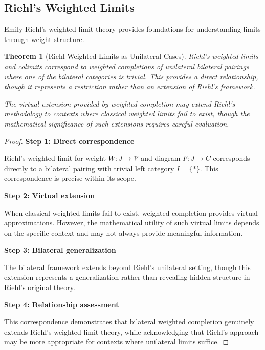 \documentclass[11pt]{article}
\theoremstyle{plain}
\newtheorem{theorem}{Theorem}[section]
\theoremstyle{definition}
\theoremstyle{remark}
\newcommand{\V}{\mathcal{V}}
\begin{document}
\subsection{Riehl's Weighted Limits}

Emily Riehl's weighted limit theory \cite{riehl2008weighted,riehl2014categorical} provides foundations for understanding limits through weight structure.

\begin{theorem}[Riehl Weighted Limits as Unilateral Cases]\label{thm:riehl-correspondence}
Riehl's weighted limits and colimits correspond to weighted completions of unilateral bilateral pairings where one of the bilateral categories is trivial. This provides a direct relationship, though it represents a restriction rather than an extension of Riehl's framework.

The virtual extension provided by weighted completion may extend Riehl's methodology to contexts where classical weighted limits fail to exist, though the mathematical significance of such extensions requires careful evaluation.
\end{theorem}

\begin{proof}
\textbf{Step 1: Direct correspondence}

Riehl's weighted limit for weight $W : J \to \V$ and diagram $F : J \to C$ corresponds directly to a bilateral pairing with trivial left category $I = \{*\}$. This correspondence is precise within its scope.

\textbf{Step 2: Virtual extension}

When classical weighted limits fail to exist, weighted completion provides virtual approximations. However, the mathematical utility of such virtual limits depends on the specific context and may not always provide meaningful information.

\textbf{Step 3: Bilateral generalization}

The bilateral framework extends beyond Riehl's unilateral setting, though this extension represents a generalization rather than revealing hidden structure in Riehl's original theory.

\textbf{Step 4: Relationship assessment}

This correspondence demonstrates that bilateral weighted completion genuinely extends Riehl's weighted limit theory, while acknowledging that Riehl's approach may be more appropriate for contexts where unilateral limits suffice.
\end{proof}
\end{document}
